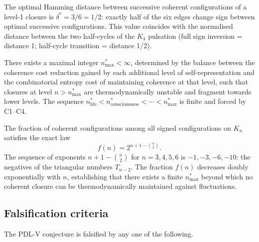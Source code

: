 \documentclass[12pt,a4paper]{article}
\theoremstyle{plain}
\theoremstyle{definition}
\theoremstyle{remark}
\newenvironment{conjecturebox}[1][]{%
  \begin{tcolorbox}[conjecturestyle,title={Conjecture\ifx\relax#1\relax\else: #1\fi}]}{\end{tcolorbox}}
\newenvironment{computedresult}[1][]{%
  \begin{tcolorbox}[computedstyle,title={Computational Result\ifx\relax#1\relax\else: #1\fi}]}{\end{tcolorbox}}
\newcommand{\PDL}{\textsc{PDL}}
\newcommand{\Kfour}{K_4}
\begin{document}
\begin{computedresult}[Optimal variation $\delta^{*}$ --- Script~3]
The optimal Hamming distance between successive coherent configurations of a
level-1 closure is $\delta^{*} = 3/6 = 1/2$: exactly half of the six edges change
sign between optimal successive configurations. This value coincides with the
normalised distance between the two half-cycles of the $\Kfour$ pulsation (full
sign inversion = distance 1; half-cycle transition = distance 1/2).
\end{computedresult}

\begin{conjecturebox}[PDL-V, Part 4 --- Thermodynamic ceiling $n^{*}_{\mathrm{max}}$]
There exists a maximal integer $n^{*}_{\mathrm{max}} < \infty$, determined by the
balance between the coherence cost reduction gained by each additional level of
self-representation and the combinatorial entropy cost of maintaining coherence at
that level, such that closures at level $n > n^{*}_{\mathrm{max}}$ are
thermodynamically unstable and fragment towards lower levels. The sequence
$n^{*}_{\mathrm{life}} < n^{*}_{\mathrm{consciousness}} < \cdots <
n^{*}_{\mathrm{max}}$ is finite and forced by C1--C4.
\end{conjecturebox}

\begin{computedresult}[Rarity law and $n^{*}_{\mathrm{max}}$ --- Script~3]
\label{thm:rarity}
The fraction of coherent configurations among all signed configurations on $K_n$
satisfies the exact law
\begin{equation}
f(n) = 2^{n + 1 - \binom{n}{2}}.
\end{equation}
The sequence of exponents $n + 1 - \binom{n}{2}$ for $n = 3, 4, 5, 6$ is
$-1, -3, -6, -10$: the negatives of the triangular numbers $T_{n-2}$. The fraction
$f(n)$ decreases doubly exponentially with $n$, establishing that there exists a
finite $n^{*}_{\mathrm{max}}$ beyond which no coherent closure can be
thermodynamically maintained against fluctuations.
\end{computedresult}

\subsection{Falsification criteria}

The \PDL-V conjecture is falsified by any one of the following.
\end{document}
